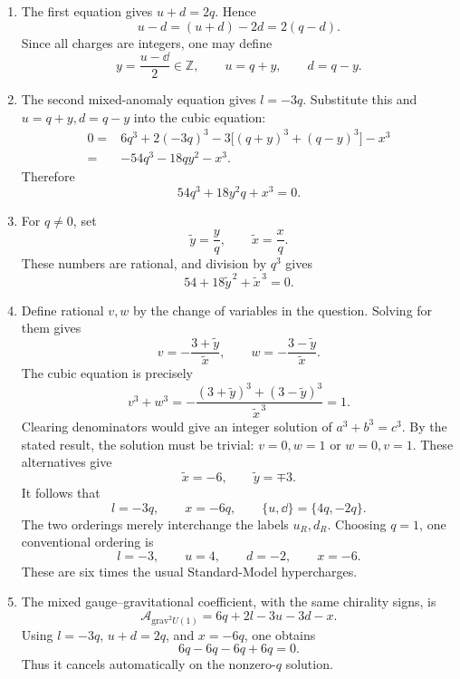 \begin{enumerate}
\begin{enumerate}
    \item[(ii)]
    The first equation gives \(u+d=2q\).  Hence
    \[
      u-d=(u+d)-2d=2(q-d).
    \]
    Since all charges are integers, one may define
    \[
      y=\frac{u-\dd}{2}\in\mathbb Z,\qquad
      u=q+y,\qquad d=q-y.
    \]

    \item[(iii)]
    The second mixed-anomaly equation gives \(l=-3q\).  Substitute this
    and \(u=q+y,d=q-y\) into the cubic equation:
    \[
    \begin{split}
      0={}&6q^3+2(-3q)^3
        -3\big[(q+y)^3+(q-y)^3\big]-x^3\\
       ={}&-54q^3-18qy^2-x^3.
    \end{split}
    \]
    Therefore
    \[
      \boxed{54q^3+18y^2q+x^3=0.}
    \]

    \item[(iv)]
    For \(q\ne0\), set
    \[
      \widetilde y=\frac{y}{q},\qquad
      \widetilde x=\frac{x}{q}.
    \]
    These numbers are rational, and division by \(q^3\) gives
    \[
      \boxed{54+18\widetilde y^{\,2}
       +\widetilde x^{\,3}=0.}
    \]

    \item[(v)]
    Define rational \(v,w\) by the change of variables in the question.
    Solving for them gives
    \[
      v=-\frac{3+\widetilde y}{\widetilde x},
      \qquad
      w=-\frac{3-\widetilde y}{\widetilde x}.
    \]
    The cubic equation is precisely
    \[
      v^3+w^3
       =-\frac{(3+\widetilde y)^3
                    +(3-\widetilde y)^3}
                   {\widetilde x^{\,3}}
       =1.
    \]
    Clearing denominators would give an integer solution of
    \(a^3+b^3=c^3\).  By the stated result, the solution must be trivial:
    \(v=0,w=1\) or \(w=0,v=1\).  These alternatives give
    \[
      \widetilde x=-6,\qquad
      \widetilde y=\mp3.
    \]
    It follows that
    \[
      l=-3q,\qquad x=-6q,\qquad
      \{u,\dd\}=\{4q,-2q\}.
    \]
    The two orderings merely interchange the labels \(u_R,d_R\).
    Choosing \(q=1\), one conventional ordering is
    \[
      \boxed{l=-3,\qquad u=4,\qquad d=-2,\qquad x=-6.}
    \]
    These are six times the usual Standard-Model hypercharges.

    \item[(vi)]
    The mixed gauge--gravitational coefficient, with the same chirality
    signs, is
    \[
      \mathcal A_{\mathrm{grav}^2U(1)}
       =6q+2l-3u-3d-x.
    \]
    Using \(l=-3q\), \(u+d=2q\), and \(x=-6q\), one obtains
    \[
      6q-6q-6q+6q=0.
    \]
    Thus it cancels automatically on the nonzero-\(q\) solution.
  \end{enumerate}


\end{enumerate}
